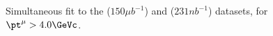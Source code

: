 \begin{figure}[hbtp]
  \begin{center}
    \caption{Simultaneous fit to the \PbPb  ($150 \mu b^{-1}$) and \pp ($231 nb^{-1}$) datasets, for $\pt^\mu>4.0\GeVc$.}
    \label{fig:final_massfit_simultaneous_nominal_pt4}
  \end{center}
\end{figure}

